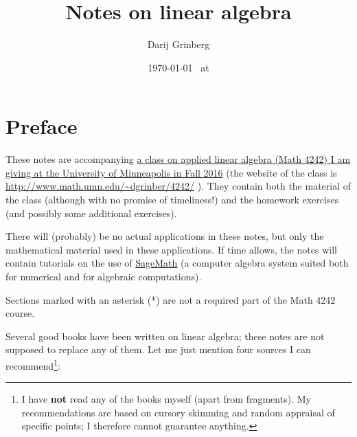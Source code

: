 \documentclass[numbers=enddot,12pt,final,onecolumn,notitlepage]{scrartcl}%
\theoremstyle{definition}
\begin{document}
\title{Notes on linear algebra}
\author{Darij Grinberg}
\date{
\today
\ at \currenttime}
\maketitle
\tableofcontents

\section{Preface}

These notes are accompanying \href{http://www.math.umn.edu/~dgrinber/4242/}{a
class on applied linear algebra (Math 4242) I am giving at the University of
Minneapolis in Fall 2016} (the website of the class is
\url{http://www.math.umn.edu/~dgrinber/4242/} ). They contain both the
material of the class (although with no promise of timeliness!) and the
homework exercises (and possibly some additional exercises).

There will (probably) be no actual applications in these notes, but only the
mathematical material used in these applications. If time allows, the notes
will contain tutorials on the use of \href{http://www.sagemath.org/}{SageMath}
(a computer algebra system suited both for numerical and for algebraic computations).

Sections marked with an asterisk (*) are not a required part of the Math 4242 course.

Several good books have been written on linear algebra; these notes are not
supposed to replace any of them. Let me just mention four sources I can
recommend\footnote{I have \textbf{not} read any of the books myself (apart
from fragments). My recommendations are based on cursory skimming and random
appraisal of specific points; I therefore cannot guarantee anything.}:
\end{document}
